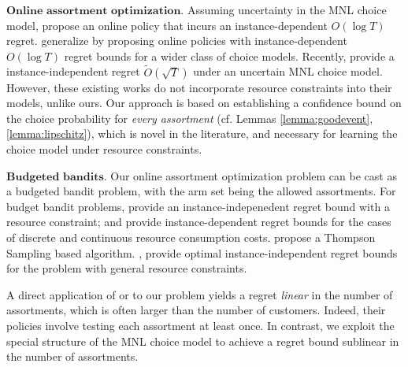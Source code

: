 \documentclass{article}
\theoremstyle{definition}
\begin{document}
$\textbf{Online assortment optimization.}$ Assuming uncertainty in the MNL choice model, \cite{RusmevichientongSS10} propose an online policy that incurs an instance-dependent $O(\log T)$ regret. %
\cite{SaureZ13} generalize \cite{RusmevichientongSS10} by proposing online policies with instance-dependent $O(\log T)$ regret bounds for a wider class of choice models. %
Recently, \cite{AgrawalAGZ16} provide a instance-independent regret $\tilde{O}(\sqrt{T})$ under an uncertain MNL choice model. %
However, these existing works do not incorporate resource constraints into their models, unlike ours. Our approach is based on establishing a confidence bound on the choice probability for \emph{every assortment} (cf. Lemmas \ref{lemma:goodevent}, \ref{lemma:lipschitz}), which is novel in the literature, and necessary for learning the choice model under resource constraints.

$\textbf{Budgeted bandits. }$Our online assortment optimization problem can be cast as a budgeted bandit problem, with the arm set being the allowed assortments. For budget bandit problems, \cite{Tran-ThanhCCRJ10} provide an instance-indepenedent regret bound with a resource constraint; \cite{Tran-ThanhCRJ12} and \cite{XiaDZYQ15} provide instance-dependent regret bounds for the cases of discrete and continuous resource consumption costs. \cite{XiaLQYL15} propose a Thompson Sampling based algorithm. \cite{BadanidiyuruKS13}, \cite{AgrawalD14} provide optimal instance-independent regret bounds for the problem with general resource constraints. 

A direct application of \cite{BadanidiyuruKS13} or \cite{AgrawalD14} to our problem yields a regret \emph{linear} in the number of assortments, which is often larger than the number of customers. Indeed, their policies involve testing each assortment at least once. In contrast, we exploit the special structure of the MNL choice model to achieve a regret bound sublinear in the number of assortments.
\end{document}
